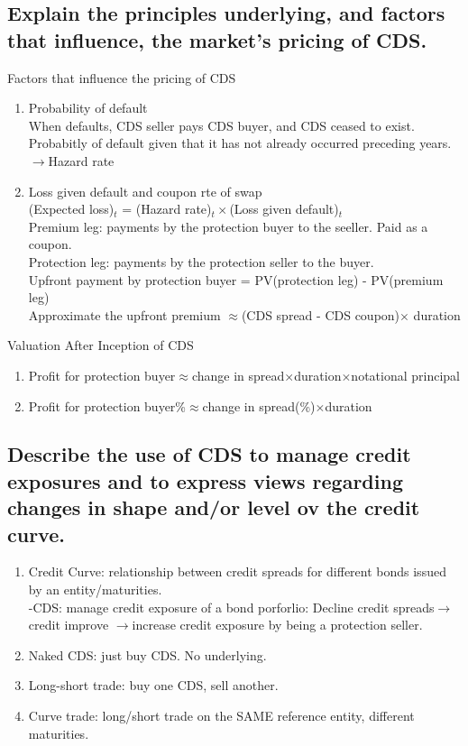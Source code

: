 \documentclass{article}
\newcommand{\be}{\begin{enumerate}}
\newcommand{\ee}{\end{enumerate}}
\newcommand{\ra}{$\rightarrow$}
\begin{document}
\subsection{Explain the principles underlying, and factors that influence, the market's
pricing of CDS.}
Factors that influence the pricing of CDS
\be
    \item Probability of default
        \\When defaults, CDS seller pays CDS buyer, and CDS ceased to exist.
        \\Probabitly of default given that it has not already occurred preceding years. \ra Hazard rate
    \item Loss given default and coupon rte of swap
        \\(Expected loss)$_t$ = (Hazard rate)$_t\times$(Loss given default)$_t$
        \\Premium leg: payments by the protection buyer to the seeller. Paid as a coupon.
        \\Protection leg: payments by the protection seller to the buyer.
        \\Upfront payment by protection buyer = PV(protection leg) - PV(premium leg)
        \\Approximate the upfront premium $\approx$(CDS spread - CDS coupon)$\times$ duration
\ee
Valuation After Inception of CDS
\be
    \item Profit for protection buyer$\approx$change in spread$\times$duration$\times$notational principal
    \item Profit for protection buyer\%$\approx$change in spread(\%)$\times$duration
\ee
\subsection{Describe the use of CDS to manage credit exposures and to express views
regarding changes in shape and/or level ov the credit curve.}
\be
    \item Credit Curve: relationship between credit spreads for different bonds issued by an
entity/maturities.
\\-CDS: manage credit exposure of a bond porforlio: Decline credit spreads\ra credit improve
\ra increase credit exposure by being a protection seller.
    \item Naked CDS: just buy CDS. No underlying.
    \item Long-short trade: buy one CDS, sell another.
    \item Curve trade: long/short trade on the SAME reference entity, different maturities.
\ee
\end{document}
